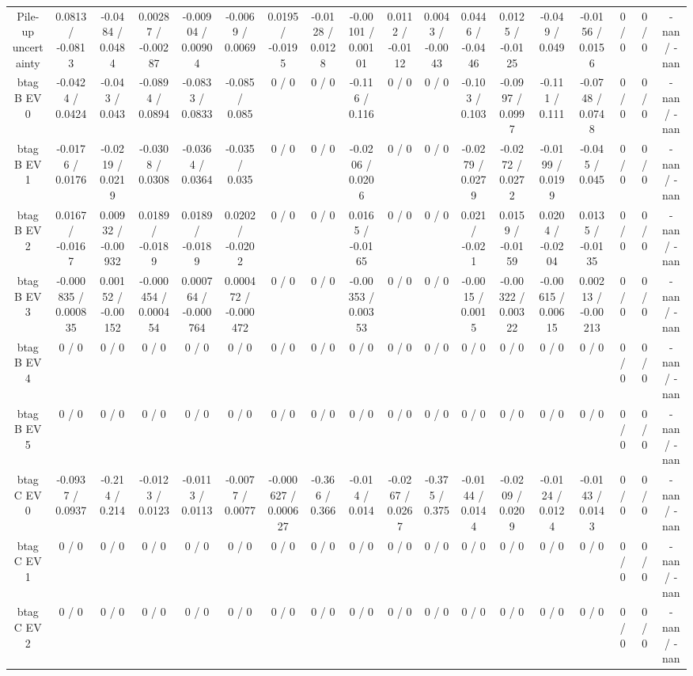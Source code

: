 \documentclass[10pt]{article}
\begin{document}
\begin{table}[htbp]
\begin{center}
\begin{tabular}{|c|c|c|c|c|c|c|c|c|c|c|c|c|c|c|c|c|c|}
  Pile-up uncertainty & 0.0813 / -0.0813 & -0.0484 / 0.0484 & 0.00287 / -0.00287 & -0.00904 / 0.00904 & -0.0069 / 0.0069 & 0.0195 / -0.0195 & -0.0128 / 0.0128 & -0.00101 / 0.00101 & 0.0112 / -0.0112 & 0.0043 / -0.0043 & 0.0446 / -0.0446 & 0.0125 / -0.0125 & -0.049 / 0.049 & -0.0156 / 0.0156 & 0 / 0 & 0 / 0 & -nan / -nan \\ 
  btag B EV 0 & -0.0424 / 0.0424 & -0.043 / 0.043 & -0.0894 / 0.0894 & -0.0833 / 0.0833 & -0.085 / 0.085 & 0 / 0 & 0 / 0 & -0.116 / 0.116 & 0 / 0 & 0 / 0 & -0.103 / 0.103 & -0.0997 / 0.0997 & -0.111 / 0.111 & -0.0748 / 0.0748 & 0 / 0 & 0 / 0 & -nan / -nan \\ 
  btag B EV 1 & -0.0176 / 0.0176 & -0.0219 / 0.0219 & -0.0308 / 0.0308 & -0.0364 / 0.0364 & -0.035 / 0.035 & 0 / 0 & 0 / 0 & -0.0206 / 0.0206 & 0 / 0 & 0 / 0 & -0.0279 / 0.0279 & -0.0272 / 0.0272 & -0.0199 / 0.0199 & -0.045 / 0.045 & 0 / 0 & 0 / 0 & -nan / -nan \\ 
  btag B EV 2 & 0.0167 / -0.0167 & 0.00932 / -0.00932 & 0.0189 / -0.0189 & 0.0189 / -0.0189 & 0.0202 / -0.0202 & 0 / 0 & 0 / 0 & 0.0165 / -0.0165 & 0 / 0 & 0 / 0 & 0.021 / -0.021 & 0.0159 / -0.0159 & 0.0204 / -0.0204 & 0.0135 / -0.0135 & 0 / 0 & 0 / 0 & -nan / -nan \\ 
  btag B EV 3 & -0.000835 / 0.000835 & 0.00152 / -0.00152 & -0.000454 / 0.000454 & 0.000764 / -0.000764 & 0.000472 / -0.000472 & 0 / 0 & 0 / 0 & -0.00353 / 0.00353 & 0 / 0 & 0 / 0 & -0.0015 / 0.0015 & -0.00322 / 0.00322 & -0.00615 / 0.00615 & 0.00213 / -0.00213 & 0 / 0 & 0 / 0 & -nan / -nan \\ 
  btag B EV 4 & 0 / 0 & 0 / 0 & 0 / 0 & 0 / 0 & 0 / 0 & 0 / 0 & 0 / 0 & 0 / 0 & 0 / 0 & 0 / 0 & 0 / 0 & 0 / 0 & 0 / 0 & 0 / 0 & 0 / 0 & 0 / 0 & -nan / -nan \\ 
  btag B EV 5 & 0 / 0 & 0 / 0 & 0 / 0 & 0 / 0 & 0 / 0 & 0 / 0 & 0 / 0 & 0 / 0 & 0 / 0 & 0 / 0 & 0 / 0 & 0 / 0 & 0 / 0 & 0 / 0 & 0 / 0 & 0 / 0 & -nan / -nan \\ 
  btag C EV 0 & -0.0937 / 0.0937 & -0.214 / 0.214 & -0.0123 / 0.0123 & -0.0113 / 0.0113 & -0.0077 / 0.0077 & -0.000627 / 0.000627 & -0.366 / 0.366 & -0.014 / 0.014 & -0.0267 / 0.0267 & -0.375 / 0.375 & -0.0144 / 0.0144 & -0.0209 / 0.0209 & -0.0124 / 0.0124 & -0.0143 / 0.0143 & 0 / 0 & 0 / 0 & -nan / -nan \\ 
  btag C EV 1 & 0 / 0 & 0 / 0 & 0 / 0 & 0 / 0 & 0 / 0 & 0 / 0 & 0 / 0 & 0 / 0 & 0 / 0 & 0 / 0 & 0 / 0 & 0 / 0 & 0 / 0 & 0 / 0 & 0 / 0 & 0 / 0 & -nan / -nan \\ 
  btag C EV 2 & 0 / 0 & 0 / 0 & 0 / 0 & 0 / 0 & 0 / 0 & 0 / 0 & 0 / 0 & 0 / 0 & 0 / 0 & 0 / 0 & 0 / 0 & 0 / 0 & 0 / 0 & 0 / 0 & 0 / 0 & 0 / 0 & -nan / -nan \\ 

\end{tabular}
\end{center}
\end{table}
\end{document}
